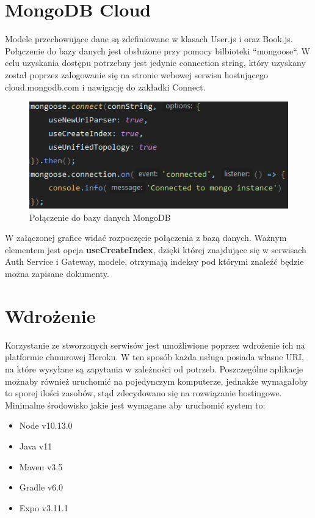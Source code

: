 \newpage
\section{MongoDB Cloud}
 
Modele przechowujące dane są zdefiniowane w klasach User.js i
oraz Book.js. Połączenie do bazy danych jest obsłużone przy pomocy bilbioteki ``mongoose``. W celu uzyskania dostępu potrzebny jest jedynie connection string, który uzyskany został poprzez zalogowanie się na stronie webowej serwisu hostującego cloud.mongodb.com i nawigację do zakładki Connect.\\
\begin{figure}[H]
	\centering
	\includegraphics[width=\linewidth]{mongo.png}
	\caption{Połączenie do bazy danych MongoDB}
\end{figure}
W załączonej grafice widać rozpoczęcie połączenia z bazą danych. Ważnym elementem jest opcja \textbf{useCreateIndex}, dzięki której znajdujące się w serwisach Auth Service i Gateway, modele, otrzymają indeksy pod którymi znaleźć będzie można zapisane dokumenty. 

\newpage
\section{Wdrożenie}

Korzystanie ze stworzonych serwisów jest umożliwione poprzez wdrożenie ich na platformie chmurowej Heroku.
W ten sposób każda usługa posiada własne URI, na które wysyłane są zapytania w zależności od potrzeb.
Poszczególne aplikacje możnaby również uruchomić na pojedynczym komputerze, jednakże wymagałoby to sporej ilości zasobów, stąd zdecydowano się na rozwiązanie hostingowe.\\

Minimalne środowisko jakie jest wymagane aby uruchomić system to:
\begin{itemize}
	\item Node v10.13.0
	\item Java v11
	\item Maven v3.5
	\item Gradle v6.0
	\item Expo v3.11.1
\end{itemize}


